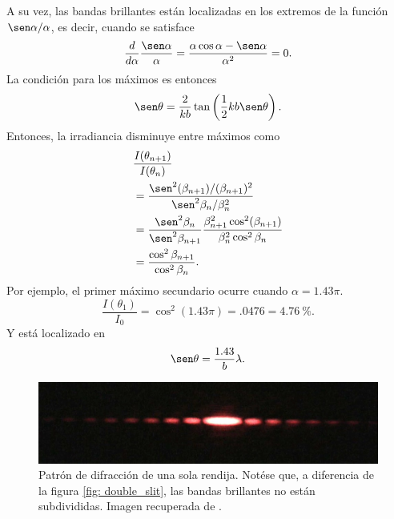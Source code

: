 \begin{multicols}{2}
A su vez, las bandas brillantes están localizadas en los extremos de la función $\sen \alpha/\alpha$, es decir, cuando se satisface
\begin{equation}
	\frac{d}{d\alpha} \frac{\sen \alpha}{\alpha} = \frac{\alpha \cos \alpha - \sen \alpha}{\alpha^2} = 0.
\end{equation}
La condición para los máximos es entonces
\begin{equation}
	\sen \theta = \frac{2}{kb} \tan \left( \frac{1}{2}kb \sen \theta \right ).
\end{equation}
Entonces, la irradiancia disminuye entre máximos como
\begin{equation}
\begin{split}
	&\frac{I(\theta_{n+1})}{I(\theta_n)}\\
	&= \frac{\sen^2(\beta_{n+1})/(\beta_{n+1})^2}{\sen^2\beta_n/\beta_n^2}\\
	&= \frac{\sen^2\beta_n}{\sen^2 \beta_{n+1}} \frac{\beta_{n+1}^2\cos^2(\beta_{n+1})}{\beta_n^2\cos^2\beta_n}\\
	&=   \frac{\cos^2\beta_{n+1}}{\cos^2\beta_n}.
\end{split}
\end{equation}
Por ejemplo, el primer máximo secundario ocurre cuando $\alpha = 1.43 \pi$.
\begin{equation}
	\frac{I(\theta_1)}{I_0} = \cos^2(1.43 \pi) = \num{.0476} = \qty{4.76}{\percent}.
\end{equation}
Y está localizado en
\begin{equation}
	\sen \theta = \frac{1.43}{b}\lambda.
\end{equation}
\begin{figure}[H]
	\centering
	\includegraphics[width=.9\linewidth]{Imagenes/single-slit}
	\caption{Patrón de difracción de una sola rendija. Notése que, a diferencia de la figura \ref{fig: double_slit}, las bandas brillantes no están subdivididas. Imagen recuperada de \parencite{single_slit}.}
	\label{fig: single-slit}
\end{figure}


\end{multicols}
